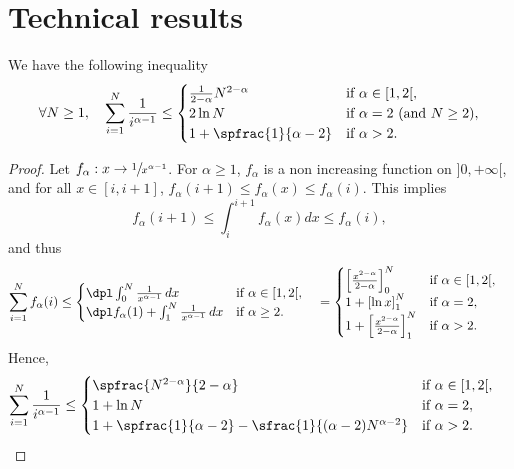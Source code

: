 \appendix

\section{Technical results}

\begin{lemma}\label{comp_serie_int}
We have the following inequality
\begin{align*}
\forall N\geq1,\quad\sum_{i=1}^N\frac{1}{i^{\alpha-1}}\leq\begin{cases}
\frac{1}{2-\alpha}N^{2-\alpha}&\text{if }\alpha\in[1,2[,\\
2\ln N&\text{if }\alpha=2 \text{ (and $N\geq2$)},\\
1+\spfrac{1}{\alpha-2}&\text{if }\alpha>2.
\end{cases}
\end{align*}
\end{lemma}

\begin{proof}
Let $f_\alpha:x\to\sfrac{1}{x^{\alpha-1}}$. For $\alpha\geq1$, $f_\alpha$ is a non increasing function on $]0,+\infty[$, and for all $x\in[i,i+1]$, $f_\alpha(i+1)\leq f_\alpha(x)\leq f_\alpha(i)$. This implies
\[
f_\alpha(i+1)\leq\int_i^{i+1}f_\alpha(x)dx\leq f_\alpha(i),
\]
and thus
\begin{align*}
\sum_{i=1}^Nf_\alpha(i)&\leq \begin{cases}
\dpl\int_0^N\frac{1}{x^{\alpha-1}}\,dx&\text{if }\alpha\in[1,2[,\\
\dpl f_\alpha(1)+\int_1^N\frac{1}{x^{\alpha-1}}\,dx&\text{if }\alpha\geq2.
\end{cases}
\quad=\begin{cases}
\Bigl[\frac{x^{2-\alpha}}{2-\alpha}\Bigr]_0^N&\text{if }\alpha\in[1,2[,\\
1+\left[\ln x\right]_1^N&\text{if }\alpha=2,\\
1+\Bigl[\frac{x^{2-\alpha}}{2-\alpha}\Bigr]_1^N&\text{if }\alpha>2.
\end{cases}
\end{align*}
Hence,
\begin{align*}
\sum_{i=1}^N\frac{1}{i^{\alpha-1}}&\leq \begin{cases}
\spfrac{N^{2-\alpha}}{2-\alpha}&\text{if }\alpha\in[1,2[,\\
1+\ln N&\text{if }\alpha=2,\\
1+\spfrac{1}{\alpha-2}-\sfrac{1}{(\alpha-2)N^{\alpha-2}}&\text{if }\alpha>2.
\end{cases}\qedhere
\end{align*}
\end{proof}

